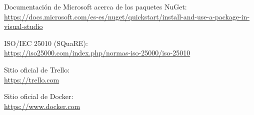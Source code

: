 \documentclass[11pt,spanish,listoffigures]{tfgetsinf}
\begin{document}
\begin{thebibliography}{10}
Documentación de Microsoft acerca de los paquetes NuGet:\\
\url{https://docs.microsoft.com/es-es/nuget/quickstart/install-and-use-a-package-in-visual-studio}

ISO/IEC 25010 (SQuaRE):\\
\url{https://iso25000.com/index.php/normas-iso-25000/iso-25010}

Sitio oficial de Trello:\\
\url{https://trello.com}

Sitio oficial de Docker:\\
\url{https://www.docker.com}

\end{thebibliography}
\end{document}
